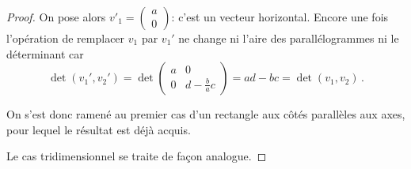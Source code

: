 \documentclass[class=report,crop=false]{standalone}
\begin{document}
\begin{proof}
\bigskip


On pose alors
$v'_1= \left(\begin{smallmatrix}a\\0\end{smallmatrix}\right)$: c'est un vecteur horizontal.
Encore une fois l'opération de remplacer $v_1$ par $v_1'$ ne change
ni l'aire des parallélogrammes
ni le déterminant car
$$\det(v_1',v_2')=
\det \begin{pmatrix}
a&0\\
0&d-\frac{b}{a}c
\end{pmatrix}
=ad-bc=\det(v_1,v_2)\, .$$


On s'est donc ramené au premier cas d'un rectangle
aux côtés parallèles aux axes, pour lequel le résultat est déjà acquis.

\bigskip

Le cas tridimensionnel se traite de façon analogue.
\end{proof}
\end{document}
